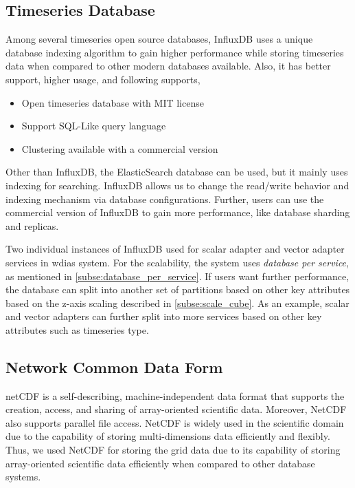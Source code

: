\subsection{Timeseries Database}
\label{subse:influxdb}

Among several timeseries open source databases, InfluxDB \cite{InfluxDBInfluxDBDocumentation} uses a unique database indexing algorithm to gain higher performance while storing timeseries data when compared to other modern databases available. Also, it has better support, higher usage, and following supports,

\begin{itemize}
  \item Open timeseries database with MIT license
  \item Support SQL-Like query language
  \item Clustering available with a commercial version
\end{itemize}

Other than InfluxDB, the ElasticSearch database can be used, but it mainly uses indexing for searching. InfluxDB allows us to change the read/write behavior and indexing mechanism via database configurations. Further, users can use the commercial version of InfluxDB to gain more performance, like database sharding and replicas.

Two individual instances of InfluxDB used for scalar adapter and vector adapter services in \acrshort{wdias} system. For the scalability, the system uses \emph{database per service}, as mentioned in \cref{subse:database_per_service}. If users want further performance, the database can split into another set of partitions based on other key attributes based on the z-axis scaling described in \cref{subse:scale_cube}. As an example, scalar and vector adapters can further split into more services based on other key attributes such as timeseries type.

\subsection{Network Common Data Form}
\label{subse:netcdf}

\acrshort{netCDF} \cite{UnidataNetworkForm} is a self-describing, machine-independent data format that supports the creation, access, and sharing of array-oriented scientific data. Moreover, NetCDF also supports parallel file access. NetCDF is widely used in the scientific domain due to the capability of storing multi-dimensions data efficiently and flexibly. Thus, we used NetCDF for storing the grid data due to its capability of storing array-oriented scientific data efficiently when compared to other database systems.

